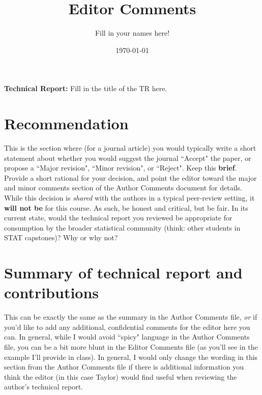 \documentclass[11pt]{article}
\title{Editor Comments}
\author{Fill in your names here!}
\date{\today}
\begin{document}
\maketitle

\noindent \textbf{Technical Report:} Fill in the title of the TR here.

\section*{Recommendation}

This is the section where (for a journal article) you would typically write a short statement about whether you would suggest the journal ``Accept" the paper, or propose a ``Major revision", ``Minor revision", or ``Reject". Keep this \textbf{brief}. Provide a short rational for your decision, and point the editor toward the major and minor comments section of the Author Comments document for details. \\

\noindent While this decision is \textit{shared} with the authors in a typical peer-review setting, it \textbf{will not be} for this course. As such, be honest and critical, but be fair. In its current state, would the technical report you reviewed be appropriate for consumption by the broader statistical community (think: other students in STAT capstones)? Why or why not? 

\section*{Summary of technical report and contributions}

This can be exactly the same as the summary in the Author Comments file, \textit{or} if you'd like to add any additional, confidential comments for the editor here you can. In general, while I would avoid ``spicy" language in the Author Comments file, you can be a bit more blunt in the Editor Comments file (as you'll see in the example I'll provide in class). In general, I would only change the wording in this section from the Author Comments file if there is additional information you think the editor (in this case Taylor) would find useful when reviewing the author's technical report.



\end{document}
